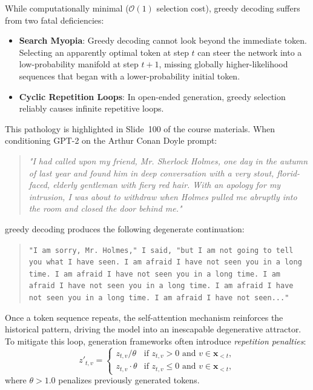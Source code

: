 \documentclass[../../../main.tex]{subfiles}
\begin{document}
While computationally minimal ($\mathcal{O}(1)$ selection cost), greedy decoding suffers from two fatal deficiencies:
\begin{itemize}
    \item \textbf{Search Myopia}: Greedy decoding cannot look beyond the immediate token. Selecting an apparently optimal token at step $t$ can steer the network into a low-probability manifold at step $t+1$, missing globally higher-likelihood sequences that began with a lower-probability initial token.
    \item \textbf{Cyclic Repetition Loops}: In open-ended generation, greedy selection reliably causes infinite repetitive loops.
\end{itemize}

This pathology is highlighted in Slide~100 of the course materials. When conditioning GPT-2 on the Arthur Conan Doyle prompt:
\begin{quote}
\emph{"I had called upon my friend, Mr. Sherlock Holmes, one day in the autumn of last year and found him in deep conversation with a very stout, florid-faced, elderly gentleman with fiery red hair. With an apology for my intrusion, I was about to withdraw when Holmes pulled me abruptly into the room and closed the door behind me."}
\end{quote}
greedy decoding produces the following degenerate continuation:
\begin{quote}
\texttt{"I am sorry, Mr. Holmes," I said, "but I am not going to tell you what I have seen. I am afraid I have not seen you in a long time. I am afraid I have not seen you in a long time. I am afraid I have not seen you in a long time. I am afraid I have not seen you in a long time. I am afraid I have not seen..."}
\end{quote}

Once a token sequence repeats, the self-attention mechanism reinforces the historical pattern, driving the model into an inescapable degenerative attractor. To mitigate this loop, generation frameworks often introduce \emph{repetition penalties}:
\begin{equation}
z'_{t,v} = \begin{cases}
z_{t,v} / \theta & \text{if } z_{t,v} > 0 \text{ and } v \in \mathbf{x}_{<t}, \\
z_{t,v} \cdot \theta & \text{if } z_{t,v} \le 0 \text{ and } v \in \mathbf{x}_{<t},
\end{cases}
\label{eq:repetition_penalty_formula}
\end{equation}
where $\theta > 1.0$ penalizes previously generated tokens.
\end{document}
